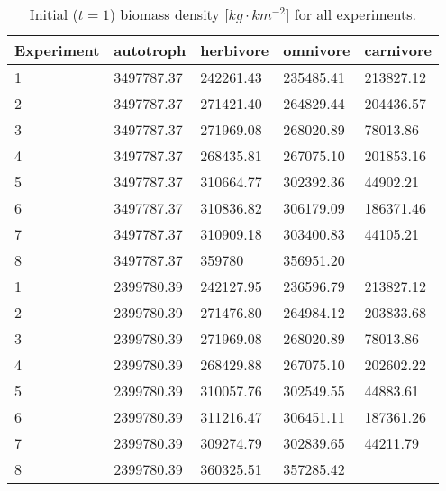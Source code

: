 \begin{table}[ht]
\centering
\caption{Initial ($t = 1$) biomass density [$kg\cdot km^{-2}$] for all experiments.} 
\label{tab:app:initialBMD}
\begin{tabular}{lllll}


Experiment & autotroph & herbivore & omnivore & carnivore \\ 
  \midrule
1 & 3497787.37 & 242261.43 & 235485.41 & 213827.12 \\ 
  2 & 3497787.37 & 271421.40 & 264829.44 & 204436.57 \\ 
  3 & 3497787.37 & 271969.08 & 268020.89 & 78013.86 \\ 
  4 & 3497787.37 & 268435.81 & 267075.10 & 201853.16 \\ 
  5 & 3497787.37 & 310664.77 & 302392.36 & 44902.21 \\ 
  6 & 3497787.37 & 310836.82 & 306179.09 & 186371.46 \\ 
  7 & 3497787.37 & 310909.18 & 303400.83 & 44105.21 \\ 
  8 & 3497787.37 & 359780 & 356951.20 &  \\ 
   [1ex]1 & 2399780.39 & 242127.95 & 236596.79 & 213827.12 \\ 
  2 & 2399780.39 & 271476.80 & 264984.12 & 203833.68 \\ 
  3 & 2399780.39 & 271969.08 & 268020.89 & 78013.86 \\ 
  4 & 2399780.39 & 268429.88 & 267075.10 & 202602.22 \\ 
  5 & 2399780.39 & 310057.76 & 302549.55 & 44883.61 \\ 
  6 & 2399780.39 & 311216.47 & 306451.11 & 187361.26 \\ 
  7 & 2399780.39 & 309274.79 & 302839.65 & 44211.79 \\ 
  8 & 2399780.39 & 360325.51 & 357285.42 &  \\ 
   \bottomrule
\end{tabular}
\end{table}
